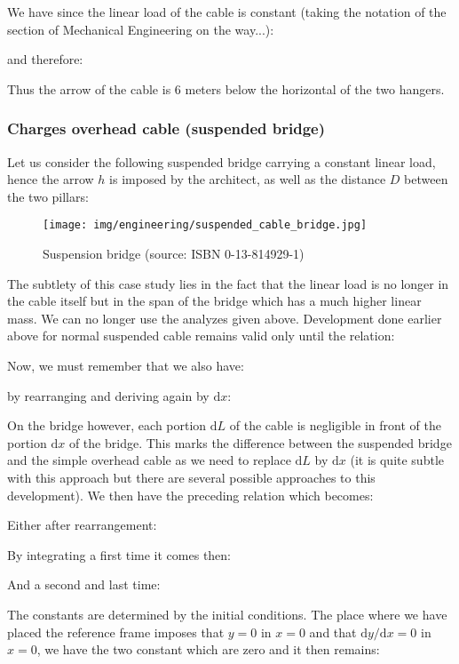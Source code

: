 \begin{itemize}
\begin{tcolorbox}[colframe=black,colback=white,sharp corners]
		We have since the linear load of the cable is constant (taking the notation of the section of Mechanical Engineering on the way...):
		
		and therefore:
		
		Thus the arrow of the cable is $6$ meters below the horizontal of the two hangers.
		\end{tcolorbox}	
	\end{itemize}
	
	\subsubsection{Charges overhead cable (suspended bridge)}
	Let us consider the following suspended bridge carrying a constant linear load, hence the arrow $h$ is imposed by the architect, as well as the distance $D$ between the two pillars:
	\begin{figure}[H]
		\centering
		\texttt{[image: img/engineering/suspended\_cable\_bridge.jpg]}
		\caption[Suspension bridge]{Suspension bridge (source: ISBN 0-13-814929-1)}
	\end{figure}
	The subtlety of this case study lies in the fact that the linear load is no longer in the cable itself but in the span of the bridge which has a much higher linear mass. We can no longer use the analyzes given above. Development done earlier above for normal suspended cable remains valid only until the relation:
	
	Now, we must remember that we also have:
	
	by rearranging and deriving again by $\mathrm{d}x$:
	
	On the bridge however, each portion $\mathrm{d}L$ of the cable is negligible in front of the portion $\mathrm{d}x$ of the bridge. This marks the difference between the suspended bridge and the simple overhead cable as we need to replace $\mathrm{d}L$ by $\mathrm{d}x$ (it is quite subtle with this approach but there are several possible approaches to this development). We then have the preceding relation which becomes:
	
	Either after rearrangement:
	
	By integrating a first time it comes then:
	
	And a second and last time:
	
	The constants are determined by the initial conditions. The place where we have placed the reference frame imposes that $y = 0$ in $x = 0$ and that $\mathrm{d}y / \mathrm{d}x = 0$ in $x = 0$, we have the two constant which are zero and it then remains:
	
